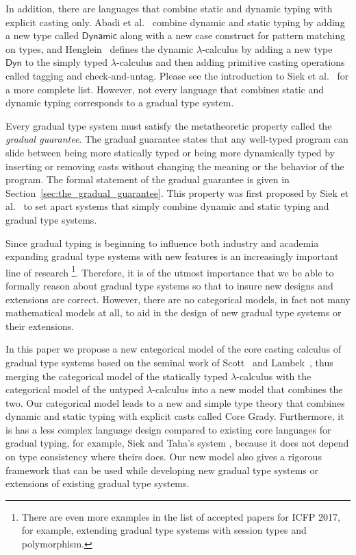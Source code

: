 In addition, there are languages that combine static and dynamic
typing with explicit casting only. Abadi et al.~\cite{Abadi:1989}
combine dynamic and static typing by adding a new type called
$\mathsf{Dynamic}$ along with a new case construct for pattern
matching on types, and Henglein~\cite{Henglein:1994} defines the
dynamic $\lambda$-calculus by adding a new type $\mathsf{Dyn}$ to the
simply typed $\lambda$-calculus and then adding primitive casting
operations called tagging and check-and-untag. Please see the
introduction to Siek et al.~\cite{Siek:2015} for a more complete
list. However, not every language that combines static and dynamic
typing corresponds to a gradual type system.

Every gradual type system must satisfy the metatheoretic property
called the \emph{gradual guarantee}.  The gradual guarantee states
that any well-typed program can slide between being more statically
typed or being more dynamically typed by inserting or removing casts
without changing the meaning or the behavior of the program. The
formal statement of the gradual guarantee is given in
Section~\ref{sec:the_gradual_guarantee}.  This property was first
proposed by Siek et al.~\cite{Siek:2015} to set apart systems that
simply combine dynamic and static typing and gradual type systems.

Since gradual typing is beginning to influence both industry and
academia expanding gradual type systems with new features is an
increasingly important line of research
\cite{Siek:2006,Siek:2007,Garcia:2016,
  Lehmann:2017:GRT:3009837.3009856,
  Jafery:2017:SUR:3093333.3009865}\footnote{There are even more
  examples in the list of accepted papers for ICFP 2017, for example,
  extending gradual type systems with session types and
  polymorphism.}.  Therefore, it is of the utmost importance that we
be able to formally reason about gradual type systems so that to
insure new designs and extensions are correct.  However, there are no
categorical models, in fact not many mathematical models at all, to
aid in the design of new gradual type systems or their extensions.

In this paper we propose a new categorical model of the core casting
calculus of gradual type systems based on the seminal work of
Scott~\cite{Sewell:2010} and Lambek~\cite{Lambek:1988}, thus merging
the categorical model of the statically typed $\lambda$-calculus with
the categorical model of the untyped $\lambda$-calculus into a new
model that combines the two.  Our categorical model leads to a new and
simple type theory that combines dynamic and static typing with
explicit casts called Core Grady.  Furthermore, it is has a less
complex language design compared to existing core languages for
gradual typing, for example, Siek and Taha's system \cite{Siek:2007},
because it does not depend on type consistency where theirs does.  Our
new model also gives a rigorous framework that can be used while
developing new gradual type systems or extensions of existing gradual
type systems.

